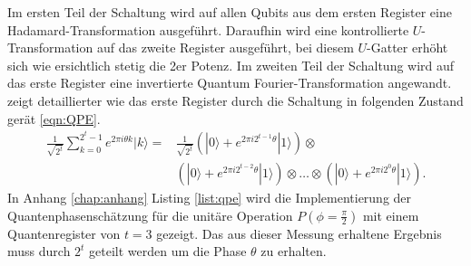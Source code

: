 Im ersten Teil der Schaltung wird auf allen Qubits aus dem ersten Register eine Hadamard-Transformation ausgef\"uhrt. Daraufhin wird eine kontrollierte $U$-Transformation auf das zweite Register ausgef\"uhrt, bei diesem $U$-Gatter erh\"oht sich wie ersichtlich stetig die 2er Potenz. Im zweiten Teil der Schaltung wird auf das erste Register eine invertierte Quantum Fourier-Transformation angewandt. \cite{Qiskit-Textbook} zeigt detaillierter wie das erste Register durch die Schaltung in folgenden Zustand ger\"at \ref{eqn:QPE}.
\begin{equation}
  \label{eqn:QPE}
  \begin{aligned}
    \frac{1}{\sqrt{2^t}}\sum\limits_{k=0}^{2^t-1}e^{2\pi i\theta k}|k\rangle = &\frac{1}{\sqrt{2^t}} \left(|0\rangle+e^{2\pi i 2^{t-1}\theta}|1\rangle\right)\otimes \\
    &\left(|0\rangle+e^{2\pi i 2^{t-2}\theta}|1\rangle\right)\otimes\dots\otimes\left(|0\rangle+e^{2\pi i 2^{0}\theta}|1\rangle\right).
  \end{aligned}
\end{equation}
In Anhang \ref{chap:anhang} Listing \ref{list:qpe} wird die Implementierung der Quantenphasensch\"atzung f\"ur die unit\"are Operation $P(\phi = \frac{\pi}{2})$ mit einem Quantenregister von $t = 3$ gezeigt. Das aus dieser Messung erhaltene Ergebnis muss durch $2^t$ geteilt werden um die Phase $\theta$ zu erhalten.
